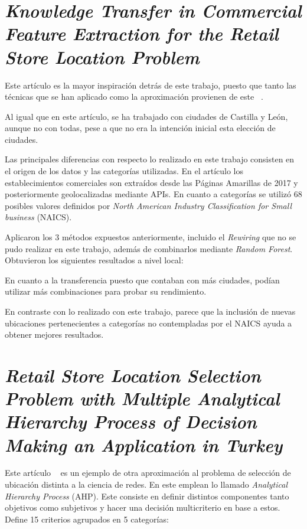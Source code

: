 
\section{\textit{Knowledge Transfer in Commercial Feature Extraction for the Retail Store Location Problem}}


Este artículo es la mayor inspiración detrás de este trabajo, puesto que tanto las técnicas que se han aplicado como la aproximación provienen de este ~\cite{Ahedo2021}. 

Al igual que en este artículo, se ha trabajado con ciudades de Castilla y León, aunque no con todas, pese a que no era la intención inicial esta elección de ciudades. 

Las principales diferencias con respecto lo realizado en este trabajo consisten en el origen de los datos y las categorías utilizadas. En el artículo los establecimientos comerciales son extraídos desde las Páginas Amarillas de 2017 y posteriormente geolocalizadas mediante APIs. En cuanto a categorías se utilizó 68 posibles valores definidos por \textit{North American Industry Classification for Small business} (NAICS).

Aplicaron los 3 métodos expuestos anteriormente, incluido el \textit{Rewiring} que no se pudo realizar en este trabajo, además de combinarlos mediante \textit{Random Forest}. Obtuvieron los siguientes resultados a nivel local:


En cuanto a la transferencia puesto que contaban con más ciudades, podían utilizar más combinaciones para probar su rendimiento.


En contraste con lo realizado con este trabajo, parece que la inclusión de nuevas ubicaciones pertenecientes a categorías no contempladas por el NAICS ayuda a obtener mejores resultados.

\section{\textit{Retail Store Location Selection Problem with Multiple Analytical Hierarchy Process of Decision Making an Application in Turkey}}

Este artículo ~\cite{RetailTurkey} es un ejemplo de otra aproximación al problema de selección de ubicación distinta a la ciencia de redes. En este emplean lo llamado \textit{Analytical Hierarchy Process} (AHP). Este consiste en definir distintos componentes tanto objetivos como subjetivos y hacer una decisión multicriterio en base a estos. Define 15 criterios agrupados en 5 categorías:



